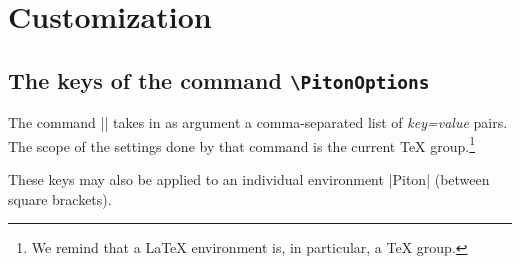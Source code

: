 \documentclass{article}
\begin{document}
\section{Customization}


\subsection{The keys of the command \texttt{\textbackslash PitonOptions}}



The command |\PitonOptions| takes in as argument a comma-separated list of
\textsl{key=value} pairs. The scope of the settings done by that command is
the current TeX group.\footnote{We remind that a LaTeX environment is, in
particular, a TeX group.}

These keys may also be applied to an individual environment |{Piton}| (between
square brackets).
\end{document}
